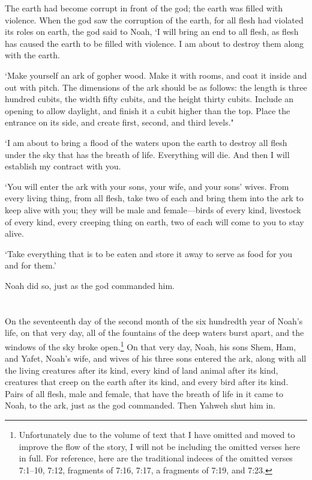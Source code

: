 The earth had become corrupt in front of the god;
the earth was filled with violence.
When the god saw the corruption of the earth,
for all flesh had violated its roles on earth,
the god said to Noah, `I will bring an end to all flesh,
as flesh has caused the earth to be filled with violence.
I am about to destroy them along with the earth.

`Make yourself an ark of gopher wood.
Make it with rooms, 
and coat it inside and out with pitch.
The dimensions of the ark should be as follows: 
the length is three hundred cubits, 
the width fifty cubits,
and the height thirty cubits.
Include an opening to allow daylight,
and finish it a cubit higher than the top.
Place the entrance on its side, 
and create first, second, and third levels."

`I am about to bring a flood of the waters upon the earth 
to destroy all flesh under the sky that has the breath of life.
Everything will die.
And then I will establish my contract with you.

`You will enter the ark
with your sons,
your wife,
and your sons' wives. 
From every living thing,
from all flesh,
take two of each and bring them into the ark 
to keep alive with you;
they will be male and female---birds of every kind,
livestock of every kind,
every creeping thing on earth,
two of each will come to you to stay alive.

`Take everything that is to be eaten and store it away
to serve as food for you 
and for them.'

Noah did so, just as the god commanded him.

\section*{\secsep}
On the seventeenth day of the second month
of the six hundredth year of Noah's life,
on that very day, all of the fountains of 
the deep waters
burst apart,
and the windows of the sky broke open.\footnote{
Unfortunately due to the volume of text that I have
omitted and moved to improve the flow of the story, 
I will not be including the omitted verses here in full.
For reference, here are the traditional indeces 
of the omitted verses 7:1--10, 7:12, fragments of 7:16, 7:17, a fragments of 7:19, and 7:23.}
On that very day, Noah, his sons Shem, Ham, and Yafet,
Noah's wife, and wives of his three sons entered the ark,
along with
all the living creatures after its kind,
every kind of land animal after its kind, 
creatures that creep on the earth after its kind,
and every bird after its kind.
Pairs of all flesh, male and female,
that have the breath of life in it came to Noah, to the ark,
just as the god commanded.
Then Yahweh shut him in.

